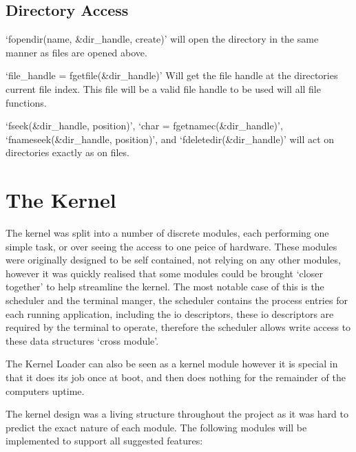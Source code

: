 \documentclass[a4paper]{report}
\begin{document}
\subsection{Directory Access}

`fopendir(name, \&dir\_handle, create)' will open the directory in the same manner as files are opened above.


`file\_handle = fgetfile(\&dir\_handle)' Will get the file handle at the directories current file index. This file will be a valid file handle to be used will all file functions.

`fseek(\&dir\_handle, position)', `char = fgetnamec(\&dir\_handle)', `fnameseek(\&dir\_handle, position)', and `fdeletedir(\&dir\_handle)' will act on directories exactly as on files.






















\clearpage
\section{The Kernel}

The kernel was split into a number of discrete modules, each performing one simple task, or over seeing the access to one peice of hardware. These modules were originally designed to be self contained, not relying on any other modules, however it was quickly realised that some modules could be brought `closer together' to help streamline the kernel. The most notable case of this is the scheduler and the terminal manger, the scheduler contains the process entries for each running application, including the io descriptors, these io descriptors are required by the terminal to operate, therefore the scheduler allows write access to these data structures `cross module'.

The Kernel Loader can also be seen as a kernel module however it is special in that it does its job once at boot, and then does nothing for the remainder of the computers uptime.


The kernel design was a living structure throughout the project as it was hard to predict the exact nature of each module. The following modules will be implemented to support all suggested features:
\end{document}
